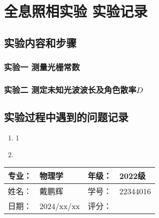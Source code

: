 \documentclass[dvipsnames, svgnames,a4paper,11pt]{article}
\begin{document}
\section{全息照相实验 \quad\heiti 实验记录}
\subsection{实验内容和步骤}

	\subsubsection{实验一 测量光栅常数}
	
	
	\subsubsection{实验二 测定未知光波波长及角色散率$D$}

		







\subsection{实验过程中遇到的问题记录}

	\begin{enumerate}
		\item  1
		\item 
	\end{enumerate}

		

\clearpage
\begin{table}
	\renewcommand\arraystretch{1.7}
	\begin{tabularx}{\textwidth}{|X|X|X|X|}
	\hline

	专业：& 物理学 &年级：& 2022级\\
	\hline
	姓名： & 戴鹏辉 & 学号：& 22344016\\
	\hline
    日期：& 2024/xx/xx & 评分： &\\
	\hline
	\end{tabularx}
\end{table}
\end{document}
